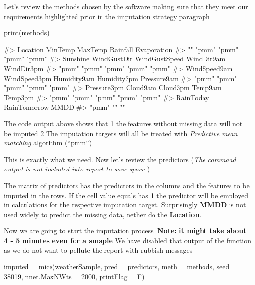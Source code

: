 Let's review the methods chosen by the software making sure that they
meet our requirements highlighted prior in the imputation strategy
paragraph

\begin{Schunk}
\begin{Sinput}
print(methods)
\end{Sinput}
\begin{Soutput}
#>      Location       MinTemp       MaxTemp      Rainfall   Evaporation 
#>            ""         "pmm"         "pmm"         "pmm"         "pmm" 
#>      Sunshine   WindGustDir WindGustSpeed    WindDir9am    WindDir3pm 
#>         "pmm"         "pmm"         "pmm"         "pmm"         "pmm" 
#>  WindSpeed9am  WindSpeed3pm   Humidity9am   Humidity3pm   Pressure9am 
#>         "pmm"         "pmm"         "pmm"         "pmm"         "pmm" 
#>   Pressure3pm      Cloud9am      Cloud3pm       Temp9am       Temp3pm 
#>         "pmm"         "pmm"         "pmm"         "pmm"         "pmm" 
#>     RainToday  RainTomorrow          MMDD 
#>         "pmm"            ""            ""
\end{Soutput}
\end{Schunk}

The code output above shows that 1 the features without missing data
will not be imputed 2 The imputation targets will all be treated with
\emph{Predictive mean matching} algorithm (``pmm'')

This is exactly what we need. Now let's review the predictors (\emph{The
command output is not included into report to save space })

The matrix of predictors has the predictors in the columns and the
features to be imputed in the rows. If the cell value equals has
\textbf{1} the predictor will be employed in calculations for the
respective imputation target. Surprisingly \textbf{MMDD} is not used
widely to predict the missing data, nether do the \textbf{Location}.

Now we are going to start the imputation process. \textbf{Note: it might
take about 4 - 5 minutes even for a smaple} We have disabled that output
of the function as we do not want to pollute the report with rubbish
messages

\begin{Schunk}
\begin{Sinput}
imputed = mice(weatherSample, pred = predictors, meth = methods, seed = 38019,
               nnet.MaxNWts = 2000, printFlag = F)
\end{Sinput}
\end{Schunk}

